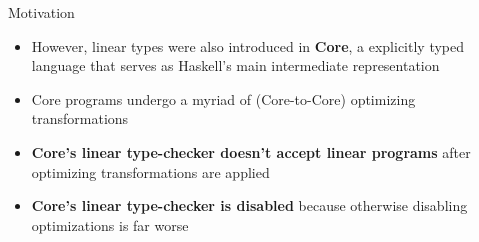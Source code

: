 \documentclass[14pt,aspectratio=169]{beamer}
\begin{document}
\begin{frame}{Motivation}
\begin{itemize}
    \item<1-> However, linear types were also introduced in \textbf<1>{Core}, a
        explicitly typed language that serves as Haskell's main intermediate
        representation
    \item<2-> Core programs undergo a myriad of (Core-to-Core)
        optimizing transformations
    \item<3-> \textbf<3>{Core's linear type-checker doesn't accept linear
        programs} after optimizing transformations are applied
    \item<4-> \textbf<4>{Core's linear type-checker is disabled} because
        otherwise disabling optimizations is far worse
\end{itemize}
\end{frame}
\end{document}
